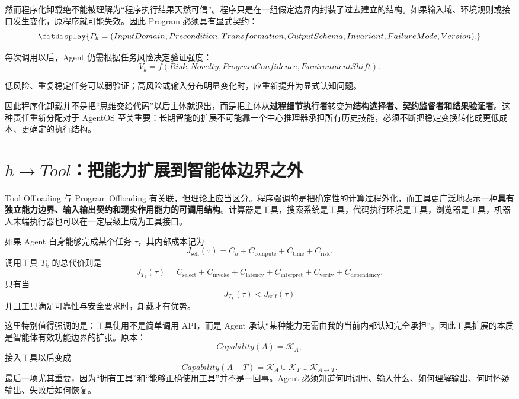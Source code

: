 然而程序化卸载绝不能被理解为“程序执行结果天然可信”。程序只是在一组假定边界内封装了过去建立的结构。如果输入域、环境规则或接口发生变化，原程序就可能失效。因此 Program 必须具有显式契约：
\begin{equation}
\fitdisplay{
P_k
=
(
InputDomain,
Precondition,
Transformation,
OutputSchema,
Invariant,
FailureMode,
Version
).
}
\end{equation}

每次调用以后，Agent 仍需根据任务风险决定验证强度：
\begin{equation}
V_k
=
f(
Risk,
Novelty,
ProgramConfidence,
EnvironmentShift
).
\end{equation}

低风险、重复稳定任务可以弱验证；高风险或输入分布明显变化时，应重新提升为显式认知问题。

因此程序化卸载并不是把“思维交给代码”以后主体就退出，而是把主体从\textbf{过程细节执行者}转变为\textbf{结构选择者、契约监督者和结果验证者}。这种责任重新分配对于 AgentOS 至关重要：长期智能的扩展不可能靠一个中心推理器承担所有历史技能，必须不断把稳定变换转化成更低成本、更确定的执行结构。

\section{$h\rightarrow Tool$：把能力扩展到智能体边界之外}

Tool Offloading 与 Program Offloading 有关联，但理论上应当区分。程序强调的是把确定性的计算过程外化，而工具更广泛地表示一种\textbf{具有独立能力边界、输入输出契约和现实作用能力的可调用结构}。计算器是工具，搜索系统是工具，代码执行环境是工具，浏览器是工具，机器人末端执行器也可以在一定层级上成为工具接口。

如果 Agent 自身能够完成某个任务 $\tau$，其内部成本记为
\begin{equation}
J_{\mathrm{self}}(\tau)
=
C_h
+
C_{\mathrm{compute}}
+
C_{\mathrm{time}}
+
C_{\mathrm{risk}}.
\end{equation}
调用工具 $T_k$ 的总代价则是
\begin{equation}
J_{T_k}(\tau)
=
C_{\mathrm{select}}
+
C_{\mathrm{invoke}}
+
C_{\mathrm{latency}}
+
C_{\mathrm{interpret}}
+
C_{\mathrm{verify}}
+
C_{\mathrm{dependency}}.
\end{equation}
只有当
\begin{equation}
J_{T_k}(\tau)
<
J_{\mathrm{self}}(\tau)
\end{equation}
并且工具满足可靠性与安全要求时，卸载才有优势。

这里特别值得强调的是：工具使用不是简单调用 API，而是 Agent 承认“某种能力无需由我的当前内部认知完全承担”。因此工具扩展的本质是智能体有效功能边界的扩张。原本：
\begin{equation}
Capability(A)=\mathcal K_A,
\end{equation}
接入工具以后变成
\begin{equation}
Capability(A+T)
=
\mathcal K_A
\cup
\mathcal K_T
\cup
\mathcal K_{A\leftrightarrow T}.
\end{equation}
最后一项尤其重要，因为“拥有工具”和“能够正确使用工具”并不是一回事。Agent 必须知道何时调用、输入什么、如何理解输出、何时怀疑输出、失败后如何恢复。

